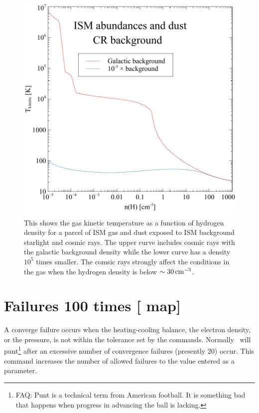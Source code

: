 \begin{figure}
\centering
\includegraphics[scale=0.7]{crDensityTemp/crDensityTemp}
\caption[Effects of cosmic ray background on gas temperature]
{\label{fig:crDensityTemp}This shows  
the gas kinetic temperature as a function of hydrogen density for a parcel of ISM gas and dust
exposed to  ISM background starlight and cosmic rays.
The upper curve includes cosmic rays with the galactic background density while
the lower curve has a density $10^5$ times smaller.
The comsic rays strongly affect the conditions in the gas when the hydrogen density is below
$\sim 30 {\rm\thinspace cm^{-3}}$.}
\end{figure}


\section{Failures 100 times [ map]}

A converge failure occurs when the heating-cooling balance,
the electron
density, or the pressure, is not within the tolerance set by the
 commands.
Normally \Cloudy\ will
punt\footnote{FAQ:  Punt is a technical term from American football.
It is
something bad that happens when progress in advancing the ball is lacking.}
after an excessive number of convergence failures (presently 20)
occur.
This command increases the number of allowed failures to the value
entered as a parameter.

